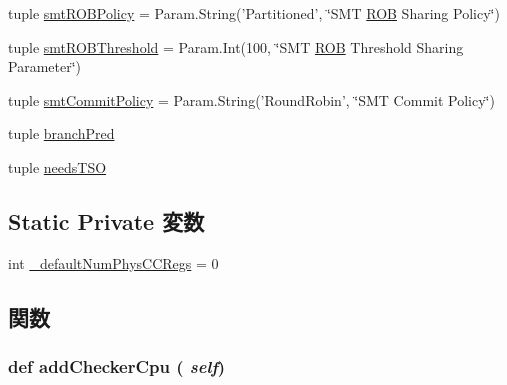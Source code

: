 \begin{DoxyCompactItemize}
\item 
tuple \hyperlink{classO3CPU_1_1DerivO3CPU_a70c4adeb48862e8ac639815b506c3b3d}{smtROBPolicy} = Param.String('Partitioned', \char`\"{}SMT \hyperlink{classROB}{ROB} Sharing Policy\char`\"{})
\item 
tuple \hyperlink{classO3CPU_1_1DerivO3CPU_ab9a64d632e45630d1caeb00b91723a9e}{smtROBThreshold} = Param.Int(100, \char`\"{}SMT \hyperlink{classROB}{ROB} Threshold Sharing Parameter\char`\"{})
\item 
tuple \hyperlink{classO3CPU_1_1DerivO3CPU_aaba9a761fafbefed59136db55af6bd6a}{smtCommitPolicy} = Param.String('RoundRobin', \char`\"{}SMT Commit Policy\char`\"{})
\item 
tuple \hyperlink{classO3CPU_1_1DerivO3CPU_ac566dd90d96e45183abc6f54c960ffec}{branchPred}
\item 
tuple \hyperlink{classO3CPU_1_1DerivO3CPU_a0a878d111d7f807d12573f1d0305f7cc}{needsTSO}
\end{DoxyCompactItemize}
\subsection*{Static Private 変数}
\begin{DoxyCompactItemize}
\item 
int \hyperlink{classO3CPU_1_1DerivO3CPU_ae9356ac9392bb55de74ea37bd9d46685}{\_\-defaultNumPhysCCRegs} = 0
\end{DoxyCompactItemize}


\subsection{関数}
\hypertarget{classO3CPU_1_1DerivO3CPU_a97c178b398a7fc7e24932f2058d14381}{
\subsubsection[{addCheckerCpu}]{\setlength{\rightskip}{0pt plus 5cm}def addCheckerCpu ( {\em self})}}
\label{classO3CPU_1_1DerivO3CPU_a97c178b398a7fc7e24932f2058d14381}



